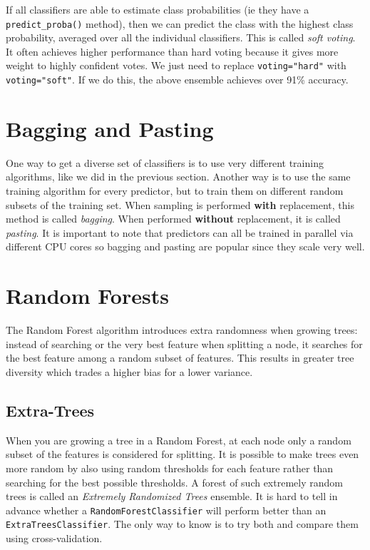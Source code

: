 \documentclass[letterpaper]{article}
\begin{document}
If all classifiers are able to estimate class probabilities (ie they have a \texttt{predict\_proba()} method), then we can predict the class with the highest class probability, averaged over all the individual classifiers. This is called \textsl{soft voting}. It often achieves higher performance than hard voting because it gives more weight to highly confident votes. We just need to replace \texttt{voting="hard"} with \texttt{voting="soft"}. If we do this, the above ensemble achieves over 91\% accuracy. 

\section{Bagging and Pasting}
One way to get a diverse set of classifiers is to use very different training algorithms, like we did in the previous section. Another way is to use the same training algorithm for every predictor, but to train them on different random subsets of the training set. When sampling is performed \textbf{with} replacement, this method is called \textsl{bagging}. When performed \textbf{without} replacement, it is called \textsl{pasting}. It is important to note that predictors can all be trained in parallel via different CPU cores so bagging and pasting are popular since they scale very well. 

\section{Random Forests}
The Random Forest algorithm introduces extra randomness when growing trees: instead of searching or the very best feature when splitting a node, it searches for the best feature among a random subset of features. This results in greater tree diversity which trades a higher bias for a lower variance. 

\subsection{Extra-Trees}
When you are growing a tree in a Random Forest, at each node only a random subset of the features is considered for splitting. It is possible to make trees even more random by also using random thresholds for each feature rather than searching for the best possible thresholds. A forest of such extremely random trees is called an \textsl{Extremely Randomized Trees} ensemble. It is hard to tell in advance whether a \texttt{RandomForestClassifier} will perform better than an \texttt{ExtraTreesClassifier}. The only way to know is to try both and compare them using cross-validation. 
\end{document}
